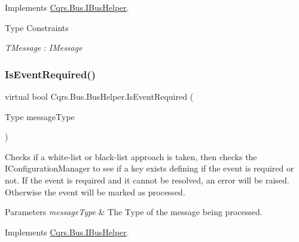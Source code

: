 Implements \hyperlink{interfaceCqrs_1_1Bus_1_1IBusHelper_a29751c186da5e2b042067af6a1be6d5d_a29751c186da5e2b042067af6a1be6d5d}{Cqrs.\+Bus.\+I\+Bus\+Helper}.

\begin{Desc}
\item[Type Constraints]\begin{description}
\item[{\em T\+Message} : {\em I\+Message}]\end{description}
\end{Desc}
\mbox{\label{classCqrs_1_1Bus_1_1BusHelper_a28c675e976adbf348637ec6ff6410c1a_a28c675e976adbf348637ec6ff6410c1a}} 
\subsubsection{\texorpdfstring{Is\+Event\+Required()}{IsEventRequired()}\hspace{0.1cm}{\footnotesize\ttfamily [1/2]}}
{\footnotesize\ttfamily virtual bool Cqrs.\+Bus.\+Bus\+Helper.\+Is\+Event\+Required (\begin{DoxyParamCaption}\item[{Type}]{message\+Type }\end{DoxyParamCaption})\hspace{0.3cm}{\ttfamily [virtual]}}



Checks if a white-\/list or black-\/list approach is taken, then checks the I\+Configuration\+Manager to see if a key exists defining if the event is required or not. If the event is required and it cannot be resolved, an error will be raised. Otherwise the event will be marked as processed. 


\begin{DoxyParams}{Parameters}
{\em message\+Type} & The Type of the message being processed.\\
\hline
\end{DoxyParams}


Implements \hyperlink{interfaceCqrs_1_1Bus_1_1IBusHelper_acddf7635d6de08e3b09d552361fe4fda_acddf7635d6de08e3b09d552361fe4fda}{Cqrs.\+Bus.\+I\+Bus\+Helper}.

\mbox{\label{classCqrs_1_1Bus_1_1BusHelper_a60a9603d5c6b7f29ee42491475714895_a60a9603d5c6b7f29ee42491475714895}} 
